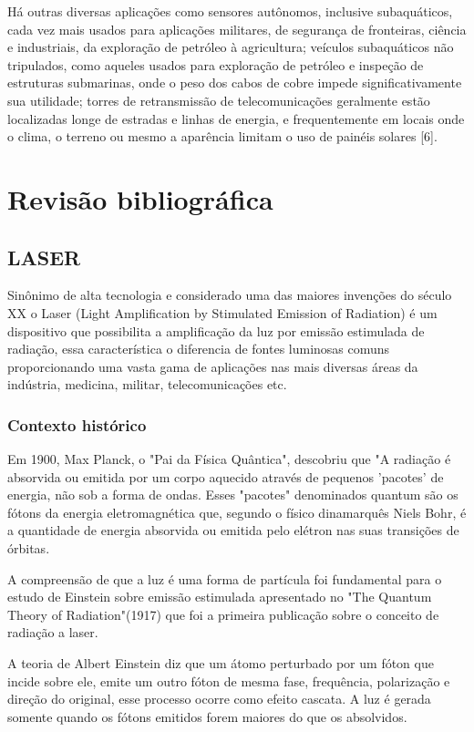 \documentclass[numeric]{fei}
\begin{document}
Há outras diversas aplicações como sensores autônomos, inclusive subaquáticos, cada vez mais usados para aplicações militares, de segurança de fronteiras, ciência e industriais, da exploração de petróleo à agricultura; veículos subaquáticos não tripulados, como aqueles usados para exploração de petróleo e inspeção de estruturas submarinas, onde o peso dos cabos de cobre impede significativamente sua utilidade; torres de retransmissão de telecomunicações geralmente estão localizadas longe de estradas e linhas de energia, e frequentemente em locais onde o clima, o terreno ou mesmo a aparência limitam o uso de painéis solares [6].

\chapter{Revisão bibliográfica}

\section{LASER}

Sinônimo de alta tecnologia e considerado uma das maiores invenções do século XX o Laser (Light Amplification by Stimulated Emission of Radiation) é um dispositivo que possibilita a amplificação da luz por emissão estimulada de radiação, essa característica o diferencia de fontes luminosas comuns proporcionando uma vasta gama de aplicações nas mais diversas áreas da indústria, medicina, militar, telecomunicações etc.

\subsection{Contexto histórico}

Em 1900, Max Planck, o "Pai da Física Quântica", descobriu que "A radiação é absorvida ou emitida por um corpo aquecido através de pequenos 'pacotes' de energia, não sob a forma de ondas. Esses "pacotes" denominados quantum são os fótons da energia eletromagnética que, segundo o físico dinamarquês Niels Bohr, é a quantidade de energia absorvida ou emitida pelo elétron nas suas transições de órbitas.

A compreensão de que a luz é uma forma de partícula foi fundamental para o estudo de Einstein sobre emissão estimulada apresentado no "The Quantum Theory of Radiation"(1917) que foi a primeira publicação sobre o conceito de radiação a laser.

A teoria de Albert Einstein diz que um átomo perturbado por um fóton que incide sobre ele, emite um outro fóton de mesma fase, frequência, polarização e direção do original, esse processo ocorre como efeito cascata. A luz é gerada somente quando os fótons emitidos forem maiores do que os absolvidos.
\end{document}
